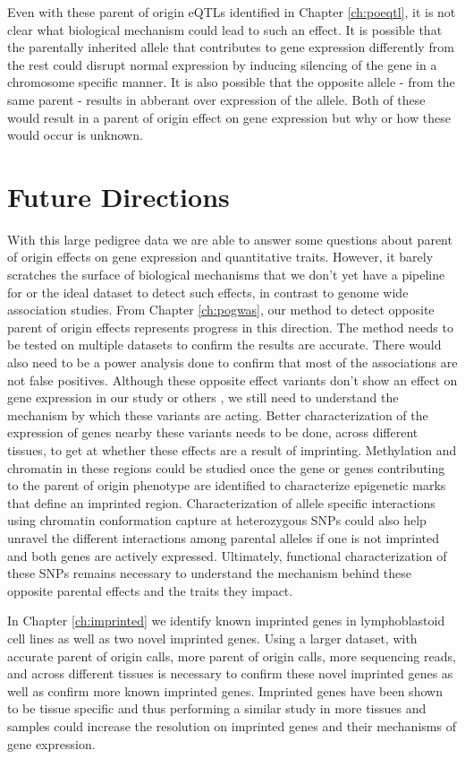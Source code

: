 Even with these parent of origin eQTLs identified in Chapter \ref{ch:poeqtl}, it is not clear what biological mechanism could lead to such an effect. It is possible that the parentally inherited allele that contributes to gene expression differently from the rest could disrupt normal expression by inducing silencing of the gene in a chromosome specific manner. It is also possible that the opposite allele - from the same parent - results in abberant over expression of the allele. Both of these would result in a parent of origin effect on gene expression but why or how these would occur is unknown. 

\section{Future Directions}

With this large pedigree data we are able to answer some questions about parent of origin effects on gene expression and quantitative traits. However, it barely scratches the surface of biological mechanisms that we don't yet have a pipeline for or the ideal dataset to detect such effects, in contrast to genome wide association studies. From Chapter \ref{ch:pogwas}, our method to detect opposite parent of origin effects represents progress in this direction. The method needs to be tested on multiple datasets to confirm the results are accurate. There would also need to be a power analysis done to confirm that most of the associations are not false positives. Although these opposite effect variants don't show an effect on gene expression in our study or others \cite{Benonisdottir:2016dz}, we still need to understand the mechanism by which these variants are acting. Better characterization of the expression of genes nearby these variants needs to be done, across different tissues, to get at whether these effects are a result of imprinting. Methylation and chromatin in these regions could be studied once the gene or genes contributing to the parent of origin phenotype are identified to characterize epigenetic marks that define an imprinted region. Characterization of allele specific interactions using chromatin conformation capture at heterozygous SNPs could also help unravel the different interactions among parental alleles if one is not imprinted and both genes are actively expressed. Ultimately, functional characterization of these SNPs remains necessary to understand the mechanism behind these opposite parental effects and the traits they impact.

In Chapter \ref{ch:imprinted} we identify known imprinted genes in lymphoblastoid cell lines as well as two novel imprinted genes. Using a larger dataset, with accurate parent of origin calls, more parent of origin calls, more sequencing reads, and across different tissues is necessary to confirm these novel imprinted genes as well as confirm more known imprinted genes. Imprinted genes have been shown to be tissue specific \cite{Baran:2015cx} and thus performing a similar study in more tissues and samples could increase the resolution on imprinted genes and their mechanisms of gene expression. 

